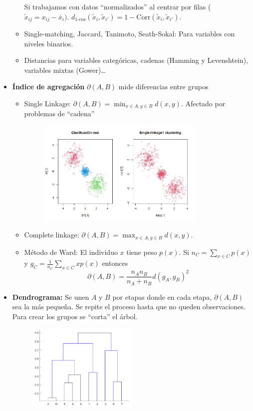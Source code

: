 \begin{itemize}
\begin{itemize}
        Si trabajamos con datos ``normalizados'' al centrar por filas ($\tilde{x}_{ij}=x_{ij}-\overline{x}_i)$. $d_{\text{1-cos}}(\tilde{x}_i,\tilde{x}_{i'})=1-\text{Corr}(\tilde{x}_i,\tilde{x}_{i'})$.
        \item Single-matching, Jaccard, Tanimoto, Seath-Sokal: Para variables con niveles binarios.
        \item Distancias para variables categóricas, cadenas (Hamming y Levenshtein), variables mixtas (Gower)\dots
    \end{itemize}
    \item \textbf{Índice de agregación} $\partial(A,B)$ mide diferencias entre grupos
    \begin{itemize}
        \item Single Linkage: $\partial(A,B)=\min_{x\in A,y\in B}d(x,y)$. Afectado por problemas de ``cadena''
        \begin{figure}[h]
            \centering
            \includegraphics[width=0.8\textwidth]{assets/chain_effect.png}
        \end{figure}
        \newpage
        \item Complete linkage: $\partial(A,B)=\max_{x\in A,y\in B}d(x,y)$.
        \item Método de Ward: El individuo $x$ tiene peso $p(x)$. Si $n_C=\sum_{x\in C}p(x)$ y $g_C=\frac{1}{n_C}\sum_{x\in C}xp(x)$ entonces
        \[
            \partial(A,B)=\frac{n_A n_B}{n_A+n_B}d(g_A, g_B)^2
        \]
    \end{itemize}
    \item \textbf{Dendrograma:} Se unen $A$ y $B$ por etapas donde en cada etapa, $\partial(A,B)$ sea la más pequeña. Se repite el proceso hasta que no queden observaciones. Para crear los grupos se ``corta'' el árbol.
    \begin{figure}[h]
        \centering
        \includegraphics[width=0.5\textwidth]{assets/dendograma.png}

\end{figure}
\end{itemize}
